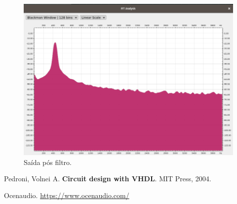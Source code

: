 \documentclass{article}
\begin{document}
\begin{figure}[!htb]
	\centering
	\includegraphics[scale=1]{saida_teste440_2000.png}
	\caption{Saída pós filtro.}
	\label{fig:fir2}
\end{figure}



\begin{thebibliography}{9}
	 Pedroni, Volnei A. \textbf{Circuit design with VHDL}. MIT Press, 2004.

	 Ocenaudio. \url{https://www.ocenaudio.com/}
\end{thebibliography}
\end{document}
